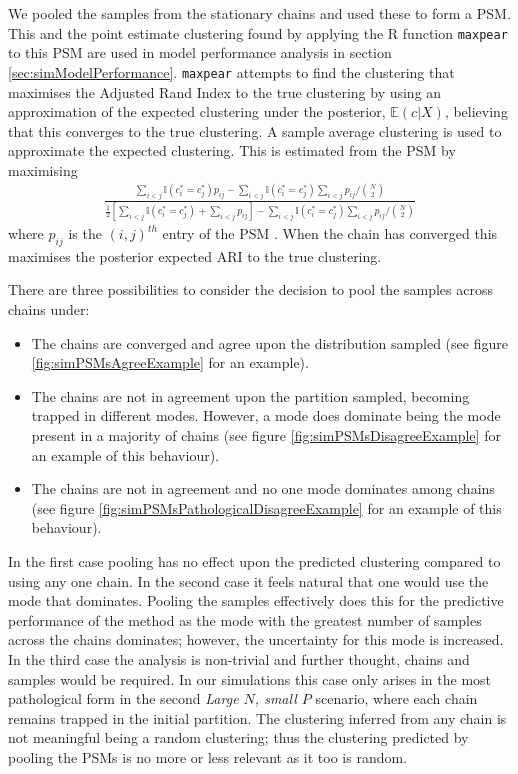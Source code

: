 \documentclass[]{article}
\begin{document}
We pooled the samples from the stationary chains and used these to form a PSM. This and the point estimate clustering found by applying the R function \texttt{maxpear} \citep{fritsch2012mcclust} to this PSM are used in model performance analysis in section \ref{sec:simModelPerformance}. \texttt{maxpear} attempts to find the clustering that maximises the Adjusted Rand Index to the true clustering by using an approximation of the expected clustering under the posterior, $\mathbb{E}(c|X)$, believing that this converges to the true clustering. A sample average clustering is used to approximate the expected clustering. This is estimated from the PSM by maximising
\begin{align}
	\frac{\sum_{i < j}\mathbb{I}(c_i^* = c_j^*) p_{ij} - \sum_{i < j}\mathbb{I}(c_i^* = c_j^*)\sum_{i < j}p_{ij} / {N \choose 2}}{\frac{1}{2}\left[\sum_{i < j}\mathbb{I}(c_i^* = c_j^*) + \sum_{i < j}p_{ij}\right] - \sum_{i < j}\mathbb{I}(c_i^* = c_j^*)\sum_{i < j}p_{ij} / {N \choose 2}}
\end{align}
where $p_{ij}$ is the $(i,j)^{th}$ entry of the PSM \citep{fritsch2009improved}. When the chain has converged this maximises the posterior expected ARI to the true clustering.

There are three possibilities to consider the decision to pool the samples across chains under:
\begin{itemize}
	\item The chains are converged and agree upon the distribution sampled (see figure \ref{fig:simPSMsAgreeExample} for an example).
	\item The chains are not in agreement upon the partition sampled, becoming trapped in different modes. However, a mode does dominate being the mode present in a majority of chains (see figure \ref{fig:simPSMsDisagreeExample} for an example of this behaviour).
	\item The chains are not in agreement and no one mode dominates among chains (see figure \ref{fig:simPSMsPathologicalDisagreeExample} for an example of this behaviour).
\end{itemize}
In the first case pooling has no effect upon the predicted clustering compared to using any one chain. In the second case it feels natural that one would use the mode that dominates. Pooling the samples effectively does this for the predictive performance of the method as the mode with the greatest number of samples across the chains dominates; however, the uncertainty for this mode is increased. In the third case the analysis is non-trivial and further thought, chains and samples would be required. In our simulations this case only arises in the most pathological form in the second \emph{Large $N$, small $P$} scenario, where each chain remains trapped in the initial partition. The clustering inferred from any chain is not meaningful being a random clustering; thus the clustering predicted by pooling the PSMs is no more or less relevant as it too is random. 
\end{document}

